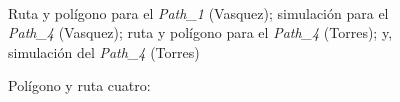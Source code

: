 \documentclass[]{report}
\begin{document}
\begin{figure}%
	\centering
	\hspace{8pt}%
	 \\
	\hspace{8pt}%
	
	\caption[A set of four subfigures.]{Polígono y ruta cuatro:}
	 Ruta y polígono para el \textit{Path\_1} (Vasquez);
	 simulación para el \textit{Path\_4} (Vasquez);
	 ruta y polígono para el \textit{Path\_4} (Torres); y,
	 simulación del \textit{Path\_4} (Torres)%
	\label{path_4}%
\end{figure}
\end{document}
